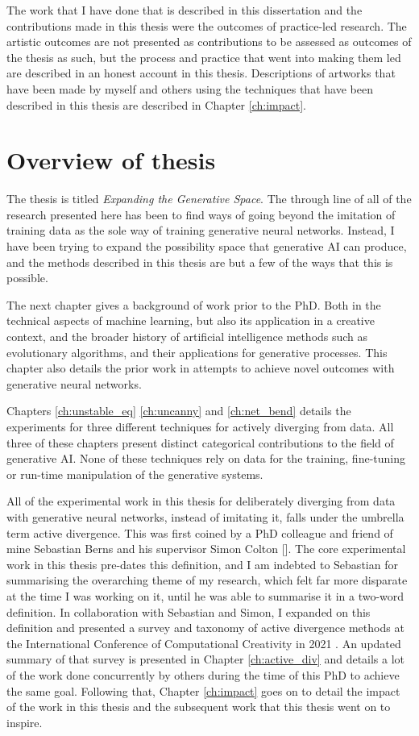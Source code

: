 The work that I have done that is described in this dissertation and the contributions made in this thesis were the outcomes of practice-led research. 
The artistic outcomes are not presented as contributions to be assessed as outcomes of the thesis as such, but the process and practice that went into making them led are described in an honest account in this thesis. 
Descriptions of artworks that have been made by myself and others using the techniques that have been described in this thesis are described in Chapter \ref{ch:impact}.

\section{Overview of thesis}

The thesis is titled \textit{Expanding the Generative Space}. 
The through line of all of the research presented here has been to find ways of going beyond the imitation of training data as the sole way of training generative neural networks. 
Instead, I have been trying to expand the possibility space that generative AI can produce, and the methods described in this thesis are but a few of the ways that this is possible. 

The next chapter gives a background of work prior to the PhD. 
Both in the technical aspects of machine learning, but also its application in a creative context, and the broader history of artificial intelligence methods such as evolutionary algorithms, and their applications for generative processes. 
This chapter also details the prior work in attempts to achieve novel outcomes with generative neural networks.

Chapters \ref{ch:unstable_eq} \ref{ch:uncanny} and \ref{ch:net_bend} details the experiments for three different techniques for actively diverging from data. 
All three of these chapters present distinct categorical contributions to the field of generative AI. 
None of these techniques rely on data for the training, fine-tuning or run-time manipulation of the generative systems. 

All of the experimental work in this thesis for deliberately diverging from data with generative neural networks, instead of imitating it, falls under the umbrella term active divergence. 
This was first coined by a PhD colleague and friend of mine Sebastian Berns and his supervisor Simon Colton [\citeyear{berns2020bridging}]. 
The core experimental work in this thesis pre-dates this definition, and I am indebted to Sebastian for summarising the overarching theme of my research, which felt far more disparate at the time I was working on it, until he was able to summarise it in a two-word definition. 
In collaboration with Sebastian and Simon, I expanded on this definition and presented a survey and taxonomy of active divergence methods at the International Conference of Computational Creativity in 2021 \citep{broad2021active}.
An updated summary of that survey is presented in Chapter \ref{ch:active_div} and details a lot of the work done concurrently by others during the time of this PhD to achieve the same goal. 
Following that, Chapter \ref{ch:impact} goes on to detail the impact of the work in this thesis and the subsequent work that this thesis went on to inspire. 

